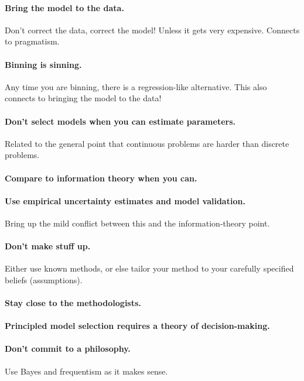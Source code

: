 \documentclass[12pt,twoside,pdftex]{article}
\begin{document}
\paragraph{Bring the model to the data.}
Don't correct the data, correct the model! Unless it gets very expensive.
Connects to pragmatism.

\paragraph{Binning is sinning.}
Any time you are binning, there is a regression-like alternative.
This also connects to bringing the model to the data!

\paragraph{Don't select models when you can estimate parameters.}
Related to the general point that continuous problems are harder
than discrete problems.

\paragraph{Compare to information theory when you can.}

\paragraph{Use empirical uncertainty estimates and model validation.}
Bring up the mild conflict between this and the information-theory
point.

\paragraph{Don't make stuff up.}
Either use known methods, or else tailor your method to your carefully
specified beliefs (assumptions).

\paragraph{Stay close to the methodologists.}

\paragraph{Principled model selection requires a theory of decision-making.}

\paragraph{Don't commit to a philosophy.}
Use Bayes and frequentism as it makes sense.
\end{document}
